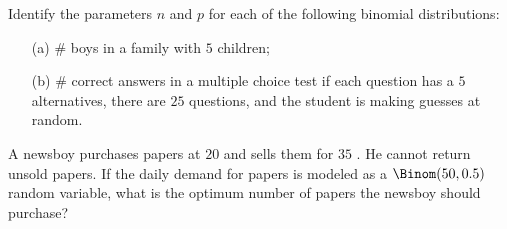 \begin{problem}[Handout 8, \# 2]
  Identify the parameters \(n\) and \(p\) for each of the following
  binomial distributions:
  \begin{itemize}
  \item[(a)] \(\#\) boys in a family with \(5\) children;
  \item[(b)] \(\#\) correct answers in a multiple choice test if each
    question has a \(5\) alternatives, there are \(25\) questions, and the
    student is making guesses at random.
  \end{itemize}
\end{problem}
\begin{solution}

\end{solution}
\newpage

\begin{problem}[Handout 8, \# 10]
  A newsboy purchases papers at \(20\) \cent{} and sells them for \(35\)
  \cent{}. He cannot return unsold papers. If the daily demand for papers
  is modeled as a \(\Binom(50,0.5)\) random variable, what is the optimum
  number of papers the newsboy should purchase?
\end{problem}
\begin{solution}

\end{solution}
\newpage

\begin{problem}[Handout 8, \# 12]
\end{problem}
\begin{solution}

\end{solution}
\newpage

\begin{problem}[Handout 8, \# 13]
\end{problem}
\begin{solution}

\end{solution}
\newpage

\begin{problem}[Handout 8, \# 14]
\end{problem}
\begin{solution}

\end{solution}
\newpage

\begin{problem}[Handout 8, \# 15]
\end{problem}
\begin{solution}

\end{solution}
\newpage

